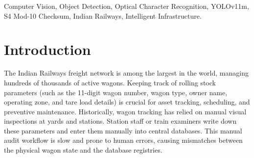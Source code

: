 \documentclass[conference]{IEEEtran}
\begin{document}
\begin{abstract}
Efficient auditing of rolling stock parameters and maintenance safety stencils is a critical logistics challenge for heavy haul railway networks. This paper presents a deep learning based automation pipeline designed for Indian Railways (CRIS) to localize and parse wagon parameters and audit maintenance stencils from high-resolution images. The system employs a custom-trained YOLOv11m object detection model to localize five parameter classes: wagon number, wagon type, owner name, operating zone, and tare load details. A secondary YOLOv11m classifier audits the presence of scheduled safety maintenance stencils. To process degraded text on metal wagon bodies caused by paint peeling, rust, and dirt, we introduce a 5-tier fallback OCR ensemble strategy combining preprocessed PaddleOCR, raw PaddleOCR, EasyOCR, and whitelisted Tesseract. The localized outputs are cross-validated using the Indian Railways standard S4 Mod-10 checksum algorithm. When characters are degraded, a combinatorial search algorithm utilizes Levenshtein distance matrix matching against the master ROAMS registry to reconstruct the most probable wagon number. The system is deployed locally via a FastAPI server, an isolated PaddleOCR GPU microservice, and a React web dashboard. Experimental evaluations on real-world rolling stock demonstrate high parsing accuracy under extreme environmental noise.
\end{abstract}

\begin{IEEEkeywords}
Computer Vision, Object Detection, Optical Character Recognition, YOLOv11m, S4 Mod-10 Checksum, Indian Railways, Intelligent Infrastructure.
\end{IEEEkeywords}

\section{Introduction}
\label{sec:introduction}
The Indian Railways freight network is among the largest in the world, managing hundreds of thousands of active wagons. Keeping track of rolling stock parameters (such as the 11-digit wagon number, wagon type, owner name, operating zone, and tare load details) is crucial for asset tracking, scheduling, and preventive maintenance. Historically, wagon tracking has relied on manual visual inspections at yards and stations. Station staff or train examiners write down these parameters and enter them manually into central databases. This manual audit workflow is slow and prone to human errors, causing mismatches between the physical wagon state and the database registries.
\end{document}
